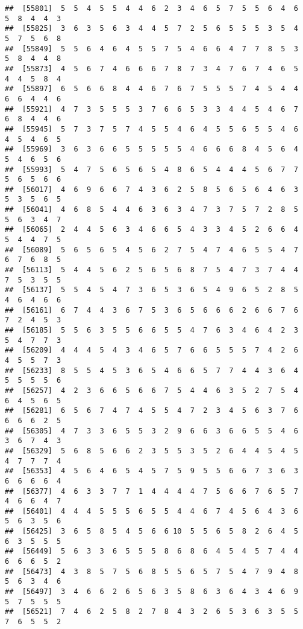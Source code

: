 \documentclass[
]{book}
\begin{document}
\begin{verbatim}
##  [55801]  5  5  4  5  5  4  4  6  2  3  4  6  5  7  5  5  6  4  6  5  8  4  4  3
##  [55825]  3  6  3  5  6  3  4  4  5  7  2  5  6  5  5  5  3  5  4  5  7  5  6  8
##  [55849]  5  5  6  4  6  4  5  5  7  5  4  6  6  4  7  7  8  5  3  5  8  4  4  8
##  [55873]  4  5  6  7  4  6  6  6  7  8  7  3  4  7  6  7  4  6  5  4  4  5  8  4
##  [55897]  6  5  6  6  8  4  4  6  7  6  7  5  5  5  7  4  5  4  4  6  6  4  4  6
##  [55921]  4  7  3  5  5  5  3  7  6  6  5  3  3  4  4  5  4  6  7  6  8  4  4  6
##  [55945]  5  7  3  7  5  7  4  5  5  4  6  4  5  5  6  5  5  4  6  4  5  4  6  5
##  [55969]  3  6  3  6  6  5  5  5  5  5  4  6  6  6  8  4  5  6  4  5  4  6  5  6
##  [55993]  5  4  7  5  6  5  6  5  4  8  6  5  4  4  4  5  6  7  7  5  6  5  6  6
##  [56017]  4  6  9  6  6  7  4  3  6  2  5  8  5  6  5  6  4  6  3  5  3  5  6  5
##  [56041]  4  6  8  5  4  4  6  3  6  3  4  7  3  7  5  7  2  8  5  5  6  3  4  7
##  [56065]  2  4  4  5  6  3  4  6  6  5  4  3  3  4  5  2  6  6  4  5  4  4  7  5
##  [56089]  5  6  5  6  5  4  5  6  2  7  5  4  7  4  6  5  5  4  7  6  7  6  8  5
##  [56113]  5  4  4  5  6  2  5  6  5  6  8  7  5  4  7  3  7  4  4  7  5  3  5  5
##  [56137]  5  5  4  5  4  7  3  6  5  3  6  5  4  9  6  5  2  8  5  4  6  4  6  6
##  [56161]  6  7  4  4  3  6  7  5  3  6  5  6  6  6  2  6  6  7  6  7  2  4  5  3
##  [56185]  5  5  6  3  5  5  6  6  5  5  4  7  6  3  4  6  4  2  3  5  4  7  7  3
##  [56209]  4  4  4  5  4  3  4  6  5  7  6  6  5  5  5  7  4  2  6  4  5  5  7  3
##  [56233]  8  5  5  4  5  3  6  5  4  6  6  5  7  7  4  4  3  6  4  5  5  5  5  6
##  [56257]  4  2  3  6  6  5  6  6  7  5  4  4  6  3  5  2  7  5  4  6  4  5  6  5
##  [56281]  6  5  6  7  4  7  4  5  5  4  7  2  3  4  5  6  3  7  6  6  6  6  2  5
##  [56305]  4  7  3  3  6  5  5  3  2  9  6  6  3  6  6  5  5  4  6  3  6  7  4  3
##  [56329]  5  6  8  5  6  6  2  3  5  5  3  5  2  6  4  4  5  4  5  4  7  7  7  4
##  [56353]  4  5  6  4  6  5  4  5  7  5  9  5  5  6  6  7  3  6  3  6  6  6  6  4
##  [56377]  4  6  3  3  7  7  1  4  4  4  4  7  5  6  6  7  6  5  7  4  6  6  4  7
##  [56401]  4  4  4  5  5  5  6  5  5  4  4  6  7  4  5  6  4  3  6  5  6  3  5  6
##  [56425]  3  6  5  8  5  4  5  6  6 10  5  5  6  5  8  2  6  4  5  6  3  5  5  5
##  [56449]  5  6  3  3  6  5  5  5  8  6  8  6  4  5  4  5  7  4  4  6  6  6  5  2
##  [56473]  4  3  8  5  7  5  6  8  5  5  6  5  7  5  4  7  9  4  8  5  6  3  4  6
##  [56497]  3  4  6  6  2  6  5  6  3  5  8  6  3  6  4  3  4  6  9  5  7  5  5  5
##  [56521]  7  4  6  2  5  8  2  7  8  4  3  2  6  5  3  6  3  5  5  7  6  5  5  2

\end{verbatim}
\end{document}
